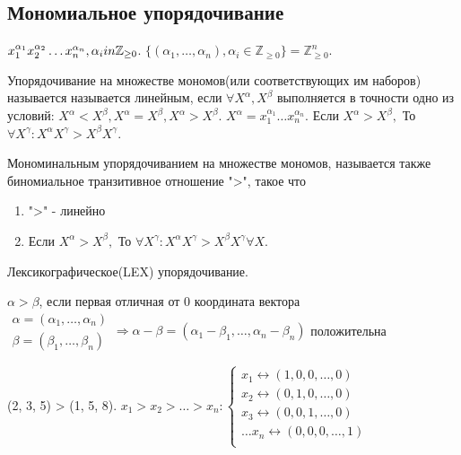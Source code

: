 \subsection{Мономиальное упорядочивание}
\(x_1^{\alpha_1}x_2^{\alpha_2}\ldots x_n^{\alpha_n}, \alpha_i\\in\mathbb{Z}_{\ge0}\). \newline
\(\{(\alpha_1,\ldots,\alpha_n), \alpha_i\in\mathbb{Z}_{\ge0}\} = \mathbb{Z}^n_{\ge0}\).
\begin{definition}
	Упорядочивание на множестве мономов(или соответствующих им наборов) называется называется линейным, если \(\forall X^\alpha, X^{\beta}\) выполняется в точности одно из условий: \(X^\alpha < X^\beta, X^\alpha = X^\beta, X^\alpha > X^\beta\). \(X^\alpha = x_1^{\alpha_1}\ldots x_n^{\alpha_n}\). Если \(X^\alpha > X^\beta,\) То \(\forall X^\gamma: X^\alpha X^\gamma > X^\beta X^\gamma \).
\end{definition}
\begin{definition}
	Мономинальным упорядочиванием на множестве мономов, называется также биномиальное  транзитивное отношение ">", такое что 
	\begin{enumerate}
		\item ">" - линейно 
		\item Если \(X^\alpha > X^\beta,\) То \(\forall X^\gamma: X^\alpha X^\gamma > X^\beta X^\gamma \forall X\).
	\end{enumerate}
\end{definition}
\begin{example}
	Лексикографическое(LEX) упорядочивание.
	\begin{definition}
		\(\alpha>\beta\), если первая отличная от 0 координата вектора \(\begin{gathered}
			\alpha = (\alpha_1,\ldots,\alpha_n) \\
			\beta = (\beta_1,\ldots, \beta_n)
		\end{gathered}\Longrightarrow \alpha-\beta = (\alpha_1-\beta_1,\ldots, \alpha_n - \beta_n)\) положительна
	\end{definition}
	(2, 3, 5) > (1, 5, 8).
	\(x_1>x_2>\ldots>x_n: \left\{\begin{gathered}
			x_1 \longleftrightarrow (1,0,0,\ldots,0) \\
			x_2 \longleftrightarrow (0,1,0,\ldots,0) \\
			x_3 \longleftrightarrow (0,0,1,\ldots,0) \\
			\ldots
			x_n \longleftrightarrow (0,0,0,\ldots,1) \\
	\end{gathered}\right.\)
\end{example}
